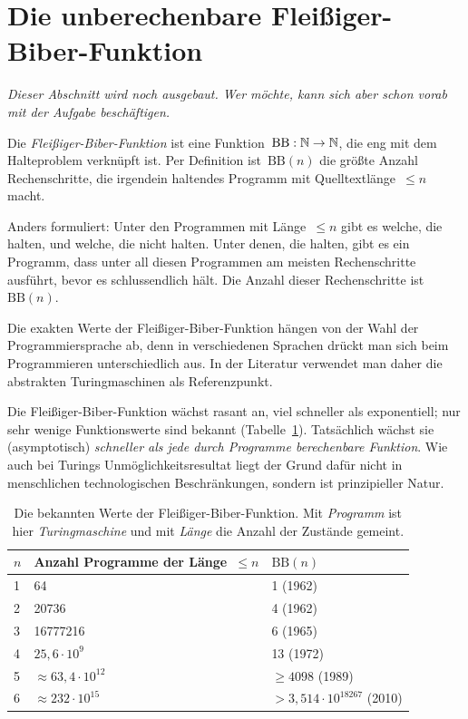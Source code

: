 \documentclass[twoside]{../zirkelblatt1415}
\theoremstyle{definition}
\theoremstyle{plain}
\theoremstyle{remark}
\newcommand{\BB}{\mathrm{BB}}
\begin{document}
\section{Die unberechenbare Fleißiger-Biber-Funktion}

\emph{Dieser Abschnitt wird noch ausgebaut. Wer möchte, kann sich aber schon
vorab mit der Aufgabe beschäftigen.}

Die \emph{Fleißiger-Biber-Funktion} ist eine Funktion~$\BB : \NN \to \NN$, die
eng mit dem Halteproblem verknüpft ist. Per Definition ist~$\BB(n)$ die größte
Anzahl Rechenschritte, die irgendein haltendes Programm mit
Quelltextlänge~$\leq n$ macht.

Anders formuliert: Unter den Programmen mit Länge~$\leq n$ gibt es welche, die
halten, und welche, die nicht halten. Unter denen, die halten, gibt es ein
Programm, dass unter all diesen Programmen am meisten Rechenschritte ausführt,
bevor es schlussendlich hält. Die Anzahl dieser Rechenschritte ist~$\BB(n)$.

Die exakten Werte der Fleißiger-Biber-Funktion hängen von der Wahl der
Programmiersprache ab, denn in verschiedenen Sprachen drückt man sich beim
Programmieren unterschiedlich aus. In der Literatur verwendet man daher die
abstrakten Turingmaschinen als Referenzpunkt.

Die Fleißiger-Biber-Funktion wächst rasant an, viel schneller als exponentiell;
nur sehr wenige Funktionswerte sind bekannt (Tabelle~\ref{tab:bb}). Tatsächlich
wächst sie (asymptotisch) \emph{schneller als jede durch Programme berechenbare
Funktion}. Wie auch bei Turings Unmöglichkeitsresultat liegt der Grund dafür
nicht in menschlichen technologischen Beschränkungen, sondern ist
prinzipieller Natur.

\begin{table}
  \begin{tabular}{@{}lll@{}}
    \toprule
    $n$ & Anzahl Programme der Länge~$\leq n$ & $\BB(n)$ \\\midrule
    1 & 64 & 1 (1962) \\
    2 & 20736 & 4 (1962) \\
    3 & 16777216 & 6 (1965) \\
    4 & $25{,}6 \cdot 10^9$ & 13 (1972) \\
    5 & $\approx 63{,}4 \cdot 10^{12}$ & $\geq 4098$ (1989) \\
    6 & $\approx 232 \cdot 10^{15}$ & $> 3{,}514 \cdot 10^{18267}$ (2010) \\
    \bottomrule
  \end{tabular}
  \centering
  \caption{\label{tab:bb}Die bekannten Werte der Fleißiger-Biber-Funktion. Mit
  \emph{Programm} ist hier \emph{Turingmaschine} und mit \emph{Länge}
  die Anzahl der Zustände gemeint.}
\end{table}
\end{document}
